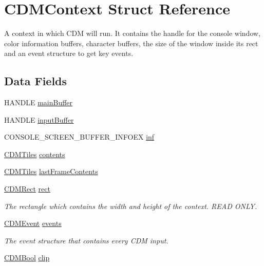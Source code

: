 \hypertarget{struct_c_d_m_context}{}\section{C\+D\+M\+Context Struct Reference}
\label{struct_c_d_m_context}


A context in which C\+DM will run. It contains the handle for the console window, color information buffers, character buffers, the size of the window inside it\textquotesingle{}s rect and an event structure to get key events.  


\subsection*{Data Fields}
\begin{DoxyCompactItemize}
\item 
H\+A\+N\+D\+LE \mbox{\hyperlink{struct_c_d_m_context_ad227f466f24fdd059e08e196f7fbab7f}{main\+Buffer}}
\item 
H\+A\+N\+D\+LE \mbox{\hyperlink{struct_c_d_m_context_adfe043e2777ad6c1ef5fc7a83b928d25}{input\+Buffer}}
\item 
C\+O\+N\+S\+O\+L\+E\+\_\+\+S\+C\+R\+E\+E\+N\+\_\+\+B\+U\+F\+F\+E\+R\+\_\+\+I\+N\+F\+O\+EX \mbox{\hyperlink{struct_c_d_m_context_a8476715d51a87d0e92e46b9be0ecd138}{inf}}
\item 
\mbox{\hyperlink{struct_c_d_m_tiles}{C\+D\+M\+Tiles}} \mbox{\hyperlink{struct_c_d_m_context_ac8c52228a53211702c5785f9c82e2f83}{contents}}
\item 
\mbox{\hyperlink{struct_c_d_m_tiles}{C\+D\+M\+Tiles}} \mbox{\hyperlink{struct_c_d_m_context_a489dca0960ee59a8f22f85c5b5fc6aed}{last\+Frame\+Contents}}
\item 
\mbox{\hyperlink{_c_d_m_8h_a23402dc2128c3c7f1e88e505a5631b9c}{C\+D\+M\+Rect}} \mbox{\hyperlink{struct_c_d_m_context_aa61e26c3b59930152cdaa0ce2dac8b14}{rect}}
\begin{DoxyCompactList}\small\item\em The rectangle which contains the width and height of the context. R\+E\+AD O\+N\+LY. \end{DoxyCompactList}\item 
\mbox{\hyperlink{struct_c_d_m_event}{C\+D\+M\+Event}} \mbox{\hyperlink{struct_c_d_m_context_ab97a0f3b9d5615487c4e542601499e94}{events}}
\begin{DoxyCompactList}\small\item\em The event structure that contains every C\+DM input. \end{DoxyCompactList}\item 
\mbox{\hyperlink{_c_d_m_8h_af5296d3141c193195e69417d1825228b}{C\+D\+M\+Bool}} \mbox{\hyperlink{struct_c_d_m_context_a56d929e4b8eb59ee92ecdc89fdab4141}{clip}}
\end{DoxyCompactItemize}


